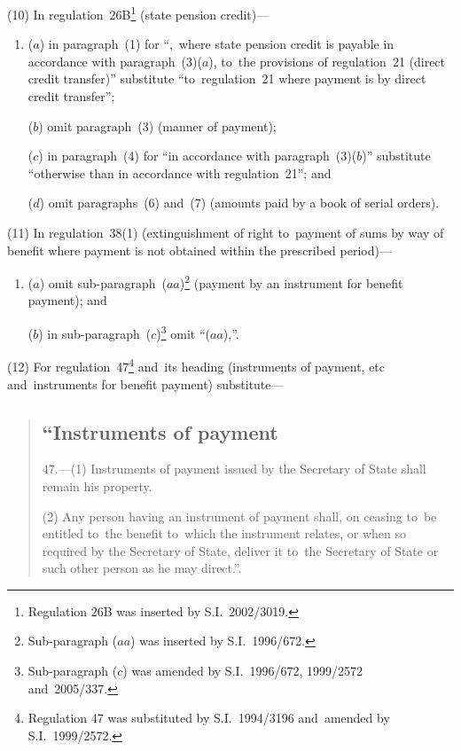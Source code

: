 \documentclass[12pt,a4paper]{article}
\begin{document}
(10) In regulation~26B\footnote{Regulation 26B was inserted by S.I.~2002/3019.} (state pension credit)—
\begin{enumerate}\item[]
($a$) in paragraph~(1) for “,~where state pension credit is payable in accordance with paragraph~(3)($a$), to~the provisions of regulation~21 (direct credit transfer)” substitute “to~regulation~21 where payment is by direct credit transfer”;

($b$) omit paragraph~(3) (manner of payment);

($c$) in paragraph~(4) for “in accordance with paragraph~(3)($b$)” substitute “otherwise than in accordance with regulation~21”; and

($d$) omit paragraphs~(6) and~(7) (amounts paid by a book of serial orders).
\end{enumerate}

(11) In regulation~38(1) (extinguishment of right to~payment of sums by way of benefit where payment is not obtained within the prescribed period)—
\begin{enumerate}\item[]
($a$) omit sub-paragraph~($aa$)\footnote{Sub-paragraph ($aa$)  was inserted by S.I.~1996/672.} (payment by an instrument for benefit payment); and

($b$) in sub-paragraph~($c$)\footnote{Sub-paragraph ($c$) was amended by S.I.~1996/672, 1999/2572 and~2005/337.} omit “($aa$),”.
\end{enumerate}

(12) For regulation~47\footnote{Regulation 47 was substituted by S.I.~1994/3196 and~amended by S.I.~1999/2572.} and~its heading (instruments of payment, etc and~instruments for benefit payment) substitute—
\begin{quotation}
\subsection*{“Instruments of payment}

47.---(1)  Instruments of payment issued by the Secretary of State shall remain his property.

(2) Any person having an instrument of payment shall, on ceasing to~be entitled to~the benefit to~which the instrument relates, or when so required by the Secretary of State, deliver it to~the Secretary of State or such other person as he may direct.”.
\end{quotation}
\end{document}
